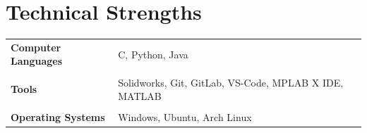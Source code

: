 \documentclass[
	11pt, %
]{resume} %
\begin{document}


\section*{Technical Strengths}
\begin{longtable}{@{} p{3.5cm} p{11.5cm} @{}}

\textbf{Computer \newline Languages} & C, Python, Java \\
\multicolumn{2}{c}{} \\ %

\textbf{Tools}              & Solidworks, Git, GitLab, VS-Code, MPLAB X IDE, MATLAB \\
\multicolumn{2}{c}{} \\ %

\textbf{Operating \newline Systems}  & Windows, Ubuntu, Arch Linux \\

\end{longtable}

\end{document}

